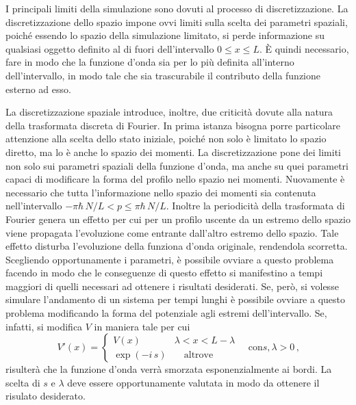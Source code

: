 \documentclass[12pt]{report}
\begin{document}
I principali limiti della simulazione sono dovuti al processo di discretizzazione. 
La discretizzazione dello spazio impone ovvi limiti sulla scelta dei parametri spaziali, poiché essendo lo spazio della simulazione limitato, si perde informazione su qualsiasi oggetto definito al di fuori dell'intervallo $ 0 \le x \le L$. È quindi necessario, fare in modo che la funzione d'onda sia per lo più definita all'interno dell'intervallo, in modo tale che sia trascurabile il contributo della funzione esterno ad esso. 

La discretizzazione spaziale introduce, inoltre, due criticità dovute alla natura della trasformata discreta di Fourier. In prima istanza bisogna porre particolare attenzione alla scelta dello stato iniziale, poiché non solo è limitato lo spazio diretto, ma lo è anche lo spazio dei momenti. La discretizzazione pone dei limiti non solo sui parametri spaziali della funzione d'onda, ma anche su quei parametri capaci di modificare la forma del profilo nello spazio nei momenti. Nuovamente è necessario che tutta l'informazione nello spazio dei momenti sia contenuta nell'intervallo $ - \pi \hbar \, N / L  < p \le \pi \hbar \, N / L  $. 
Inoltre la periodicità della trasformata di Fourier genera un effetto per cui per un profilo uscente da un estremo dello spazio viene propagata l'evoluzione come entrante dall'altro estremo dello spazio. Tale effetto disturba l'evoluzione della funziona d'onda originale, rendendola scorretta. Scegliendo opportunamente i parametri, è possibile ovviare a questo problema facendo in modo che le conseguenze di questo effetto si manifestino a tempi maggiori di quelli necessari ad ottenere i risultati desiderati. 
Se, però, si volesse simulare l'andamento di un sistema per tempi lunghi è possibile ovviare a questo problema modificando la forma del potenziale agli estremi dell'intervallo. Se, infatti, si modifica $V$ in maniera tale per cui 
\begin{equation}
    V'(x) = 
        \begin{cases}
            V(x) \quad &\lambda < x < L - \lambda \\ 
             \exp \left(-i \, s\right) &\quad  \text{altrove}
        \end{cases}
    \quad \text{con} s, \lambda > 0 %
    \, \text{,}
    \label{eq:stp_bound}
\end{equation}
risulterà che la funzione d'onda verrà smorzata esponenzialmente ai bordi. La scelta di $s$ e $\lambda$ deve essere opportunamente valutata in modo da ottenere il risulato desiderato.
\end{document}
